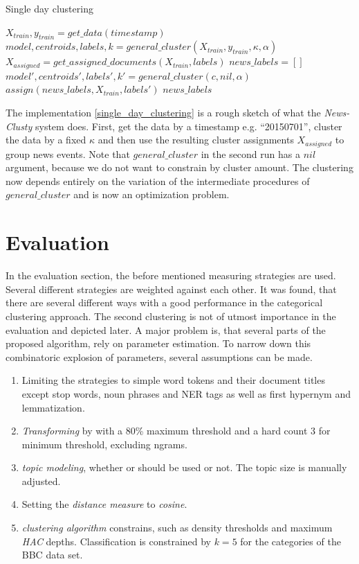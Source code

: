   \begin{algorithm}[H]
  \begin{algorithmic}[1]
    \caption{Single day clustering}\label{single_day_clustering}
      \State $X_{train},y_{train} = get\_data(timestamp)$
      \State $model,centroids,labels,k = general\_cluster(X_{train},y_{train},\kappa,\alpha)$
      \State $X_{assigned} = get\_assigned\_documents(X_{train},labels)$
      \State $news\_labels = []$
        \State $model',centroids',labels',k' = general\_cluster(c,nil,\alpha)$
        \State $assign(news\_labels, X_{train}, labels')$
      \EndFor
      \State \Return $news\_labels$
  \end{algorithmic}
  \end{algorithm}

The implementation \ref{single_day_clustering} is a rough sketch of what the \emph{News-Clusty} system does. First, get the data by a timestamp e.g. ``20150701'', cluster the data by a fixed $\kappa$ and then use the resulting cluster assignments $X_{assigned}$ to group news events. Note that $general\_cluster$ in the second run has a $nil$ argument, because we do not want to constrain by cluster amount. The clustering now depends entirely on the variation of the intermediate procedures of $general\_cluster$ and is now an optimization problem. 

\section{Evaluation}
In the evaluation section, the before mentioned measuring strategies are used. Several different strategies are weighted against each other. It was found, that there are several different ways with a good performance in the categorical clustering approach. The second clustering is not of utmost importance in the evaluation and depicted later. A major problem is, that several parts of the proposed algorithm, rely on parameter estimation. To narrow down this combinatoric explosion of parameters, several assumptions can be made.

  \begin{enumerate}
    \item Limiting the strategies to simple word tokens and their document titles except stop words, noun phrases and NER tags as well as \wordnet{} first hypernym and \wordnet{} lemmatization.

    \item \emph{Transforming} by \tfidf{} with a 80\% maximum threshold and a hard count $3$ for minimum threshold, excluding ngrams.

    \item \emph{topic modeling}, whether \lsa{} or \lda{} should be used or not. The topic size is manually adjusted.

    \item Setting the \emph{distance measure} to \emph{cosine}.

    \item \emph{clustering algorithm} constrains, such as density thresholds and maximum \emph{HAC} depths. Classification is constrained by $k=5$ for the categories of the BBC data set.
  \end{enumerate}

